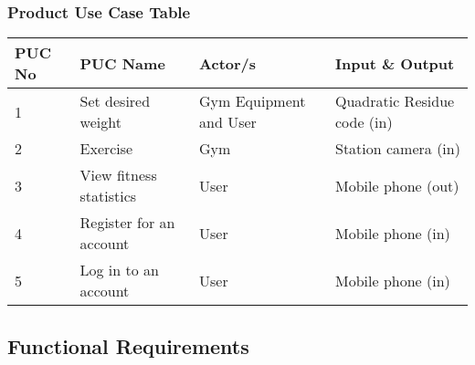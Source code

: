 \documentclass{article}
\newcommand\tab{\hspace*{2cm}}
\begin{document}
\subsubsection{Product Use Case Table}
\begingroup
\begin{centering}
\begin{tabular}{|p{2cm} | p{4cm} | p{3cm} | p{3cm} |}
    \hline
    PUC No & PUC Name & Actor/s & Input \& Output \\
    \hline
    1 & Set desired weight & Gym Equipment and User & Quadratic Residue code (in)\\
    \hline
    2 & Exercise & Gym & Station camera (in) \\
    \hline
    3 & View fitness statistics & User & Mobile phone (out) \\
    \hline
    4 & Register for an account & User & Mobile phone (in) \\
    \hline
    5 & Log in to an account & User & Mobile phone (in) \\
    \hline
\end{tabular}
\end{centering}
\endgroup



\newpage
\subsection{Functional Requirements}
\end{document}

